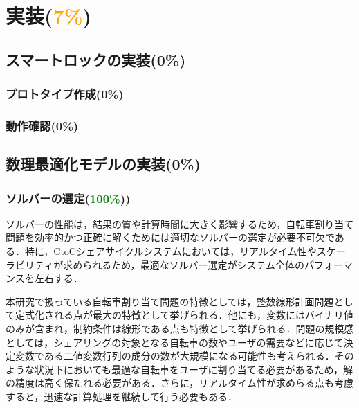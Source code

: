 \section{実装(\textcolor{orange}{7\%})}
  \label{sec:実装}
    \par
  
  \subsection{スマートロックの実装(0\%)}
    \label{sec:スマートロックの実装}
      \par
  
      \subsubsection{プロトタイプ作成(0\%)}
        \label{sec:プロトタイプ作成}
          \par
          
      \subsubsection{動作確認(0\%)}
        \label{sec:動作確認}
          \par
          
  \subsection{数理最適化モデルの実装(0\%)}
    \label{sec:数理最適化モデルの実装}
      \par
      
      \subsubsection{ソルバーの選定(\textcolor{green}{100\%}))}
        \label{sec:ソルバーの選定}
          \par ソルバーの性能は，結果の質や計算時間に大きく影響するため，自転車割り当て問題を効率的かつ正確に解くためには適切なソルバーの選定が必要不可欠である．特に，CtoCシェアサイクルシステムにおいては，リアルタイム性やスケーラビリティが求められるため，最適なソルバー選定がシステム全体のパフォーマンスを左右する．
          
          \par 本研究で扱っている自転車割り当て問題の特徴としては，整数線形計画問題として定式化される点が最大の特徴として挙げられる．他にも，変数にはバイナリ値のみが含まれ，制約条件は線形である点も特徴として挙げられる．問題の規模感としては，シェアリングの対象となる自転車の数やユーザの需要などに応じて決定変数である二値変数行列の成分の数が大規模になる可能性も考えられる．そのような状況下においても最適な自転車をユーザに割り当てる必要があるため，解の精度は高く保たれる必要がある．さらに，リアルタイム性が求めらる点も考慮すると，迅速な計算処理を継続して行う必要もある．
          
